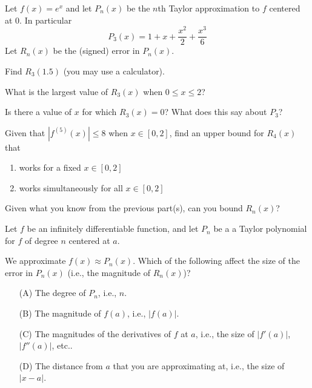 \documentclass{workbook}
\begin{document}
\begin{slide}
	\question
	Let $f(x)=e^x$ and let $P_n(x)$ be the $n$th Taylor approximation to $f$ centered at $0$. In particular
	\[
		P_3(x)=1+x+\frac{x^2}{2}+\frac{x^3}{6}
	\]
	Let $R_n(x)$ be the (signed) error in $P_n(x)$.

	\begin{parts}
		\item Find $R_3(1.5)$ (you may use a calculator).
		\item What is the largest value of $R_3(x)$ when $0\leq x\leq 2$?
		\item Is there a value of $x$ for which $R_3(x)=0$? What does this 
		say about $P_3$?

		\medskip 
		\item Given that $|f^{(5)}(x)| \leq 8$ when $x\in [0,2]$, 
		find an upper bound for $R_4(x)$ that
		\begin{enumerate}
			\item works for a fixed $x\in[0,2]$
			\item works simultaneously for all $x\in[0,2]$
		\end{enumerate}
		\item Given what you know from the previous part(s), can you bound $R_n(x)$?
	\end{parts}
\end{slide}


\begin{slide}
	\question
	Let $f$ be an infinitely differentiable function, and let $P_n$ be a
	a Taylor polynomial for $f$ of degree $n$ centered at $a$.

	We approximate $f(x)\approx P_n(x)$. Which of the following affect the
	size of the error in $P_n(x)$ (i.e., the magnitude of $R_n(x)$)?

	\begin{enumerate}
		\item[(A)] The degree of $P_n$, i.e., $n$.
		\item[(B)] The magnitude of $f(a)$, i.e., $|f(a)|$.
		\item[(C)] The magnitudes of the derivatives of $f$ at $a$, i.e., the size of $|f'(a)|$, $|f''(a)|$, etc..
		\item[(D)] The distance from $a$ that you are approximating at, i.e., 
		the size of $|x-a|$.

	\end{enumerate}
\end{slide}
\end{document}
